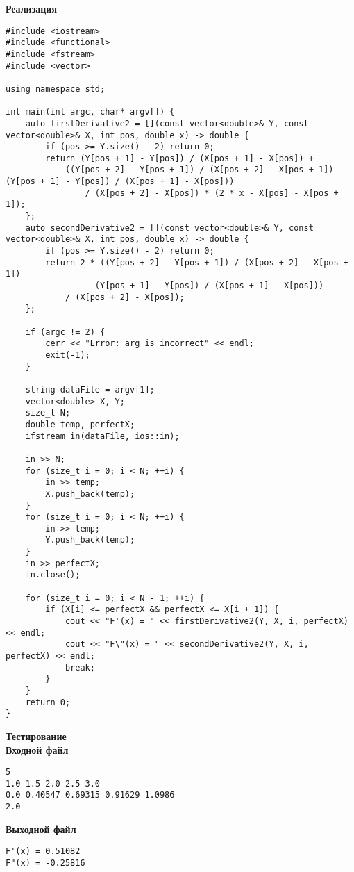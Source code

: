 \textbf{Реализация}
\begin{lstlisting}
#include <iostream>
#include <functional>
#include <fstream>
#include <vector>

using namespace std;

int main(int argc, char* argv[]) {
	auto firstDerivative2 = [](const vector<double>& Y, const vector<double>& X, int pos, double x) -> double {
		if (pos >= Y.size() - 2) return 0;
		return (Y[pos + 1] - Y[pos]) / (X[pos + 1] - X[pos]) + 
			((Y[pos + 2] - Y[pos + 1]) / (X[pos + 2] - X[pos + 1]) - (Y[pos + 1] - Y[pos]) / (X[pos + 1] - X[pos])) 
				/ (X[pos + 2] - X[pos]) * (2 * x - X[pos] - X[pos + 1]);
	};
	auto secondDerivative2 = [](const vector<double>& Y, const vector<double>& X, int pos, double x) -> double {
		if (pos >= Y.size() - 2) return 0;
		return 2 * ((Y[pos + 2] - Y[pos + 1]) / (X[pos + 2] - X[pos + 1]) 
				- (Y[pos + 1] - Y[pos]) / (X[pos + 1] - X[pos])) 
			/ (X[pos + 2] - X[pos]);
	};

	if (argc != 2) {
		cerr << "Error: arg is incorrect" << endl;
		exit(-1);
	}

	string dataFile = argv[1];
	vector<double> X, Y;
	size_t N;
	double temp, perfectX;
	ifstream in(dataFile, ios::in);

	in >> N;
	for (size_t i = 0; i < N; ++i) {
		in >> temp;
		X.push_back(temp);
	}
	for (size_t i = 0; i < N; ++i) {
		in >> temp;
		Y.push_back(temp);
	}
	in >> perfectX;
	in.close();

	for (size_t i = 0; i < N - 1; ++i) {
		if (X[i] <= perfectX && perfectX <= X[i + 1]) {
			cout << "F'(x) = " << firstDerivative2(Y, X, i, perfectX) << endl;
			cout << "F\"(x) = " << secondDerivative2(Y, X, i, perfectX) << endl;
			break;
		}
	}
	return 0;
}
\end{lstlisting}
\vspace{0.5cm}

\textbf{Тестирование}\\

\textbf{Входной файл}
\begin{verbatim}
5
1.0 1.5 2.0 2.5 3.0
0.0 0.40547 0.69315 0.91629 1.0986
2.0
\end{verbatim}

\textbf{Выходной файл}
\begin{verbatim}
F'(x) = 0.51082
F"(x) = -0.25816
\end{verbatim}

\pagebreak
